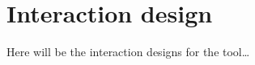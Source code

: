 \chapter{Interaction design}

Here will be the interaction designs for the tool\ldots

\nlipsum


\begin{comment}
The requirements of the molecule parameterisation tool have been specified in \chref{problems}. It has been decided to implement the tool in \verb|HTML5| and \verb|JavaScript|, which allows for great portability and availability across different operating systems and platforms. It also makes the tool future-proof, by following the current trend of bringing everything to the web~\cite{ertl2010molecular}, examples of which are \verb|JSMol|~\cite{hanson2013jsmol} and \verb|JSME|~\cite{bienfait2013jsme}~(see also \secref{software}).

Not surprisingly, there are no existing tools for fragment-based molecule parameterisation, as this is a new concept. Furthermore, no tools exist for comparing molecules - or fragments of them - either. What does exist is a wide range of tools and programs for showing and editing molecules. This includes stand-alone molecule drawing software such as \verb|Accelerys Draw|~\cite{accelrys2012accelrys} and \verb|Avogadro|~\cite{hanwell2012avogadro}, two-dimensional web-based molecule editors like \verb|ChemDoodle 2D Sketcher|~\cite{ichemlabs2013chemdoodle}, \verb|Molsoft HTML5 Molecule Editor|~\cite{molsoft2012molsoft} and \verb|Marvin for JavaScript|~\cite{chemxon2013marvin}, and online three-dimensional visualisation tools \verb|JSMol|~\cite{hanson2013jsmol} and \verb|CanvasMol|~\cite{altered2013canvasmol}.

These existing tools will serve as an initial guideline for the tool to be developed, and parts of their implementations may be reused. The rest of the tool, however, will need to be designed and developed from scratch. The design will follow the basic interaction design principles as posed by Norman and others~(see \secref{id_principles}), the knowledge about learing~(see \secref{id_learning}), and keep in mind the insights gained by the developers of other molecule software~(see \secref{software}).

As there is no existing software for fragment-based molecule parameterisation, there is also no baseline to which the developed tool can be compared. In order to still be able to say something about the quality of the tool, two different implementations of it will be made. There are a few axles along which this difference can be made. One could, for instance, compare two tools that have different visualisation methods. Visualising molecules, however, is a well-exhausted field of research, leaving very little room for new ideas. Furthermore, molecules cannot be represented in textual form here, as a visual representation is essential to perceive similarity of fragments~\cite{gallopoulos1994computer}.


\end{comment}
